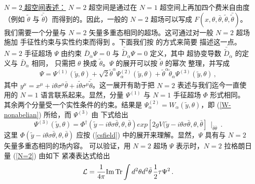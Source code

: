 \noindent\underline{$N=2$ 超空间表述：}
$N=2$ 超空间是通过在 $N=1$ 超空间上再加四个费米自由度（例如 $\tilde\theta$ 与
$\bar{\tilde\theta}$）而得到的。因此，一般的 $N=2$ 超场可以写成
$F(x,\theta,\bar\theta,\tilde\theta,\bar{\tilde\theta})$。
我们需要一个分量与 $N=2$ 矢量多重态相同的超场。这可通过对一般 $N=2$ 超场施加
手征性约束与实性约束而得到 \cite{Grimm}。下面我们按 \cite{bilal} 的方式来简要
描述这一点。$N=2$ 手征超场 $\Psi$ 由约束 $\bar
D_{\dot\alpha}\Psi=0$ 与 $\bar{\tilde D}_{\dot\alpha}\Psi=0$ 定义，其中
超协变导数 $\bar{\tilde D}_{\dot\alpha}$ 的定义与 $\bar D_{\dot\alpha}$ 相同，
只需把 $\theta$ 换成 $\tilde\theta$。$\Psi$ 的展开可以按 $\tilde\theta$ 的幂次
整理，并写成
$$
\Psi=\Psi^{(1)}(\tilde y,\theta)+\sqrt{2}\tilde\theta^\alpha
\Psi^{(2)}_\alpha(\tilde y, \theta) + \tilde\theta^\alpha
\tilde\theta_\alpha \Psi^{(3)}(\tilde y, \theta)\,,
$$
其中 $y^\mu =x^\mu +i\theta\sigma^\mu\bar\theta +i\tilde\theta
\sigma^\mu\bar{\tilde\theta}$。这一展开有助于把 $N=2$ 表述与我们迄今一直使用的
$N=1$ 语言联系起来。显然，分量 $\Psi^{(1)}$ 与 $N=1$ 手征超场 $\Phi$ 形式相同。
其余两个分量受一个实性条件的约束。结果是 $\Psi^{(2)}_\alpha=
W_\alpha (\tilde y, \theta)$，即 (\ref{W-nonabelian}) 所给，而 $\Psi^{(3)}$ 由
下式给出
$$
\Psi^{(3)}(\tilde y,\theta)= \Phi^\dagger(\tilde y-i\theta\sigma 
\bar\theta, \theta,\bar\theta) exp \left[2gV(\tilde y -i\theta\sigma
\bar\theta, \theta,\bar\theta\right]\,\mid_{\bar\theta\bar\theta}\,.
$$
这里 $\Phi(\tilde y -i\theta\sigma\bar\theta,\theta,\bar\theta)$ 应按
(\ref{csfield}) 中的展开来理解。显然，$\Psi$ 具有与 $N=2$ 矢量多重态相同的场内容。
可以验证，用 $N=2$ 超场 $\Psi$ 表示时，$N=2$ 拉格朗日量 (\ref{N=2}) 由如下
紧凑表达式给出
\begin{equation}
{\cal L}= \frac{1}{4\pi}{\rm Im\,Tr}\int d^2\theta d^2\tilde\theta\,
\frac{1}{2}\tau\Psi^2\,.
\label{N=2manifest}
\end{equation}

